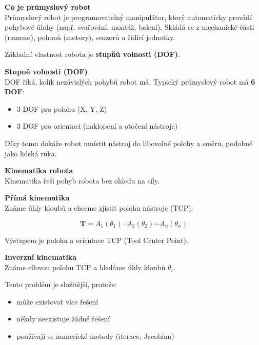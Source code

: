 \documentclass[a4paper,10pt]{article}
\begin{document}
\begin{vysvetlenibox}

\textbf{Co je průmyslový robot}\\
Průmyslový robot je programovatelný manipulátor, který automaticky
provádí pohybové úlohy (např. svařování, montáž, balení).
Skládá se z mechanické části (rameno), pohonů (motory), senzorů
a řídicí jednotky.

Základní vlastnost robota je \textbf{stupňů volnosti (DOF)}.

\textbf{Stupně volnosti (DOF)}\\
DOF říká, kolik nezávislých pohybů robot má.
Typický průmyslový robot má \textbf{6 DOF}:

\begin{itemize}[noitemsep, leftmargin=1.4em]
    \item 3 DOF pro polohu (X, Y, Z)
    \item 3 DOF pro orientaci (naklopení a otočení nástroje)
\end{itemize}

Díky tomu dokáže robot umístit nástroj do libovolné polohy a směru,
podobně jako lidská ruka.

\textbf{Kinematika robota}\\
Kinematika řeší pohyb robota bez ohledu na síly.

\begin{vzorcebox}

\textbf{Přímá kinematika}\\
Známe úhly kloubů a chceme zjistit polohu nástroje (TCP):

\[
\mathbf{T} = A_1(\theta_1) \cdot A_2(\theta_2) \cdots A_n(\theta_n)
\]

Výstupem je poloha a orientace TCP (Tool Center Point).

\vspace{4pt}

\textbf{Inverzní kinematika}\\
Známe cílovou polohu TCP a hledáme úhly kloubů $\theta_i$.

Tento problém je složitější, protože:
\begin{itemize}[noitemsep]
    \item může existovat více řešení
    \item někdy neexistuje žádné řešení
    \item používají se numerické metody (iterace, Jacobian)
\end{itemize}

\end{vzorcebox}


\end{vysvetlenibox}
\end{document}
